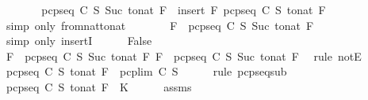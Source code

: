 \begin{isabellebody}
\ \ \ \ \isamarkupfalse%
\ \isamarkupfalse%
\ {\isachardoublequoteopen}pcp{\isacharunderscore}seq\ C\ S\ {\isacharparenleft}Suc\ {\isacharparenleft}to{\isacharunderscore}nat\ F{\isacharparenright}{\isacharparenright}\ {\isacharequal}\ insert\ F\ {\isacharparenleft}pcp{\isacharunderscore}seq\ C\ S\ {\isacharparenleft}to{\isacharunderscore}nat\ F{\isacharparenright}{\isacharparenright}{\isachardoublequoteclose}\isanewline
\ \ \ \ \ \ \isamarkupfalse%
\ {\isacharparenleft}simp\ only{\isacharcolon}\ from{\isacharunderscore}nat{\isacharunderscore}to{\isacharunderscore}nat{\isacharparenright}\isanewline
\ \ \ \ \isamarkupfalse%
\ \isamarkupfalse%
\ {\isachardoublequoteopen}F\ {\isasymin}\ pcp{\isacharunderscore}seq\ C\ S\ {\isacharparenleft}Suc\ {\isacharparenleft}to{\isacharunderscore}nat\ F{\isacharparenright}{\isacharparenright}{\isachardoublequoteclose}\isanewline
\ \ \ \ \ \ \isamarkupfalse%
\ {\isacharparenleft}simp\ only{\isacharcolon}\ insertI{}{\isacharparenright}\isanewline
\ \ \ \ \isamarkupfalse%
\ {\isachardoublequoteopen}False{\isachardoublequoteclose}\isanewline
\ \ \ \ \ \ \isamarkupfalse%
\ {\isacartoucheopen}F\ {\isasymnotin}\ pcp{\isacharunderscore}seq\ C\ S\ {\isacharparenleft}Suc\ {\isacharparenleft}to{\isacharunderscore}nat\ F{\isacharparenright}{\isacharparenright}{\isacartoucheclose}\ {\isacartoucheopen}F\ {\isasymin}\ pcp{\isacharunderscore}seq\ C\ S\ {\isacharparenleft}Suc\ {\isacharparenleft}to{\isacharunderscore}nat\ F{\isacharparenright}{\isacharparenright}{\isacartoucheclose}\ \isamarkupfalse%
\ {\isacharparenleft}rule\ notE{\isacharparenright}\isanewline
\ \ \isamarkupfalse%
\isanewline
\ \ \isamarkupfalse%
\ {\isachardoublequoteopen}pcp{\isacharunderscore}seq\ C\ S\ {\isacharparenleft}to{\isacharunderscore}nat\ F{\isacharparenright}\ {\isasymsubseteq}\ pcp{\isacharunderscore}lim\ C\ S{\isachardoublequoteclose}\isanewline
\ \ \ \ \isamarkupfalse%
\ {\isacharparenleft}rule\ pcp{\isacharunderscore}seq{\isacharunderscore}sub{\isacharparenright}\isanewline
\ \ \isamarkupfalse%
\ \isamarkupfalse%
\ {\isachardoublequoteopen}pcp{\isacharunderscore}seq\ C\ S\ {\isacharparenleft}to{\isacharunderscore}nat\ F{\isacharparenright}\ {\isasymsubseteq}\ K{\isachardoublequoteclose}\isanewline
\ \ \ \ \isamarkupfalse%
\ assms{\isacharparenleft}{}{\isacharparenright}\ \isamarkupfalse%

\end{isabellebody}
